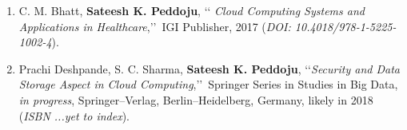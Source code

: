 \begin{enumerate}%
	
	\item%
	C. M. Bhatt, \textbf{Sateesh K. Peddoju}, \lq\lq
	\emph{Cloud Computing Systems and Applications in Healthcare},\rq\rq\, IGI Publisher, 2017
	(\emph{DOI: 10.4018/978-1-5225-1002-4}).
	
	\item%
	Prachi Deshpande, S. C. Sharma, \textbf{Sateesh K. Peddoju},
	\lq\lq \emph{Security and Data Storage Aspect in Cloud Computing},\rq\rq\, Springer Series in
	Studies in Big Data, \textit{in progress}, Springer--Verlag, Berlin--Heidelberg,
	Germany, likely in 2018 (\emph{ISBN ...yet to index}).

\end{enumerate}
